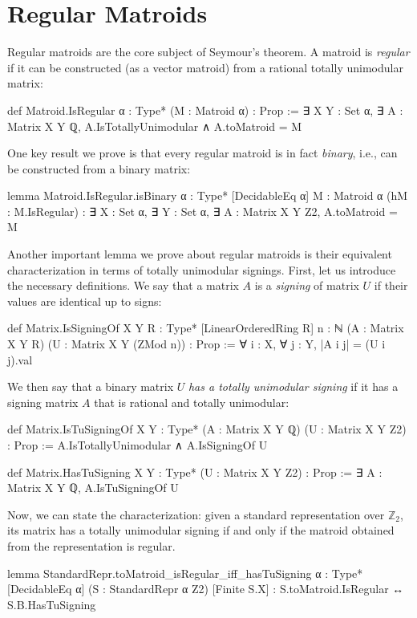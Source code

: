 \section{Regular Matroids}\label{sec:regular_matroid}

Regular matroids \cite{Oxley2011,Truemper2016} are the core subject of Seymour's theorem. A matroid is \emph{regular} if it can be constructed (as a vector matroid) from a rational totally unimodular matrix:
\begin{leancode}
def Matroid.IsRegular {α : Type*}
    (M : Matroid α) : Prop :=
  ∃ X Y : Set α, ∃ A : Matrix X Y ℚ, 
    A.IsTotallyUnimodular ∧ A.toMatroid = M
\end{leancode}
One key result we prove is that every regular matroid is in fact \emph{binary}, i.e., can be constructed from a binary matrix:
\begin{leancode}
lemma Matroid.IsRegular.isBinary
    {α : Type*} [DecidableEq α]
    {M : Matroid α} (hM : M.IsRegular) :
  ∃ X : Set α, ∃ Y : Set α, ∃ A : Matrix X Y Z2, 
    A.toMatroid = M
\end{leancode}
Another important lemma we prove about regular matroids is their equivalent characterization in terms of totally unimodular signings. First, let us introduce the necessary definitions. We say that a matrix $A$ is a \emph{signing} of matrix $U$ if their values are identical up to signs:
\begin{leancode}
def Matrix.IsSigningOf {X Y R : Type*}
    [LinearOrderedRing R] {n : ℕ}
    (A : Matrix X Y R) (U : Matrix X Y (ZMod n)) :
    Prop :=
  ∀ i : X, ∀ j : Y, |A i j| = (U i j).val
\end{leancode}
We then say that a binary matrix $U$ \emph{has a totally unimodular signing} if it has a signing matrix $A$ that is rational and totally unimodular:
\begin{leancode}
def Matrix.IsTuSigningOf {X Y : Type*} 
    (A : Matrix X Y ℚ) (U : Matrix X Y Z2) :
    Prop :=
  A.IsTotallyUnimodular ∧ A.IsSigningOf U
\end{leancode}
\begin{leancode}
def Matrix.HasTuSigning {X Y : Type*} 
    (U : Matrix X Y Z2) : Prop :=
  ∃ A : Matrix X Y ℚ, A.IsTuSigningOf U
\end{leancode}
Now, we can state the characterization: given a standard representation over $\mathbb{Z}_{2}$, its matrix has a totally unimodular signing if and only if the matroid obtained from the representation is regular.
\begin{leancode}
lemma
StandardRepr.toMatroid_isRegular_iff_hasTuSigning
    {α : Type*} [DecidableEq α]
    (S : StandardRepr α Z2) [Finite S.X] :
  S.toMatroid.IsRegular ↔ S.B.HasTuSigning
\end{leancode} 
